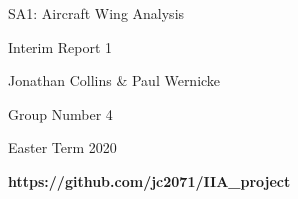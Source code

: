 \begin{titlepage}
    \begin{center}
 
        \LARGE
        SA1: Aircraft Wing Analysis
        
        \vspace{0.1cm}
        
        \LARGE
        
        Interim Report 1
        
        \vspace{0.4cm}
        
        \large
        
        Jonathan Collins \& Paul Wernicke
        
        \vspace{0cm}
        
        Group Number 4
        
        \vspace{0.3cm}
        
        Easter Term 2020
        
        \vspace{0.5cm}
        
        \textbf{https://github.com/jc2071/IIA\_project}
        
        \vspace{0.5cm}
        
        
        
        
        \lstlistoflistings
        \listoffigures
    \end{center}
\end{titlepage}
